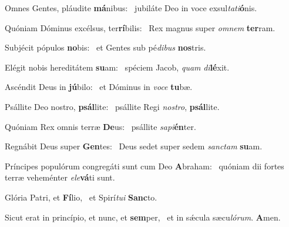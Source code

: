 \item Omnes Gentes, pláudite \textbf{má}nibus:~\psstar{} jubiláte Deo in voce exsul\textit{tati}\textbf{ó}nis.
\item Quóniam Dóminus excélsus, ter\textbf{rí}bilis:~\psstar{} Rex magnus super \textit{omnem} \textbf{ter}ram.
\item Subjécit pópulos \textbf{no}bis:~\psstar{} et Gentes sub pé\textit{dibus} \textbf{nos}tris.
\item Elégit nobis hereditátem \textbf{su}am:~\psstar{} spéciem Jacob, \textit{quam} \textit{di}\textbf{lé}xit.
\item Ascéndit Deus in \textbf{jú}bilo:~\psstar{} et Dóminus in \textit{voce} \textbf{tu}bæ.
\item Psállite Deo nostro, \textbf{psál}lite:~\psstar{} psállite Regi \textit{nostro}, \textbf{psál}lite.
\item Quóniam Rex omnis terræ \textbf{De}us:~\psstar{} psállite \textit{sapi}\textbf{én}ter.
\item Regnábit Deus super \textbf{Gen}tes:~\psstar{} Deus sedet super sedem \textit{sanctam} \textbf{su}am.
\item Príncipes populórum congre\-gáti sunt cum Deo \textbf{A}braham:~\psstar{} quóniam dii fortes terræ veheménter \textit{ele}\textbf{vá}ti sunt.
\item Glória Patri, et \textbf{Fí}lio,~\psstar{} et Spirí\textit{tui} \textbf{Sanc}to.
\item Sicut erat in princípio, et nunc, et \textbf{sem}per,~\psstar{} et in sǽcula sæcu\textit{lórum}. \textbf{A}men.
